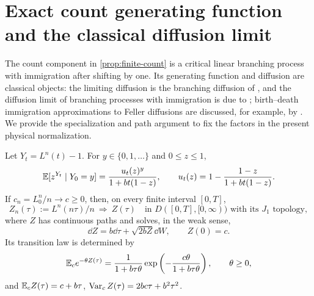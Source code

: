 \section{Exact count generating function and the classical diffusion limit}
\label{app:finite-count}

The count component in \cref{prop:finite-count} is a critical linear
branching process with immigration after shifting by one. Its generating
function and diffusion are classical objects: the limiting diffusion is the
branching diffusion of \citet{Feller1951}, and the diffusion limit of
branching processes with immigration is due to \citet{KawazuWatanabe1971};
birth--death immigration approximations to Feller diffusions are discussed,
for example, by \citet{GiornoNobile2021}. We provide the specialization and
path argument to fix the factors in the present physical normalization.

\begin{proposition}
\label{prop:count-diffusion}
Let $Y_t=L^n(t)-1$. For $y\in\{0,1,\ldots\}$ and $0\leq z\leq1$,
\begin{equation}
 \mathbb E[z^{Y_t}\mid Y_0=y]
 =\frac{u_t(z)^y}{1+bt(1-z)},\qquad
 u_t(z)=1-\frac{1-z}{1+bt(1-z)}.
 \label{eq:count-pgf}
\end{equation}
If $c_n=L_0^n/n\to c\geq0$, then, on every finite interval $[0,T]$,
\begin{equation}
 Z_n(\tau):=L^n(n\tau)/n\ \Longrightarrow\ Z(\tau)
 \quad\text{in }D([0,T],[0,\infty))\text{ with its }J_1\text{ topology},
 \label{eq:count-diffusion-limit}
\end{equation}
where $Z$ has continuous paths and solves, in the weak sense,
\begin{equation}
 \dd Z=b\dd\tau+\sqrt{2bZ}\dd W,\qquad Z(0)=c.
 \label{eq:count-sde}
\end{equation}
Its transition law is determined by
\begin{equation}
 \mathbb E_c e^{-\theta Z(\tau)}
 =\frac1{1+b\tau\theta}
   \exp\left(-\frac{c\theta}{1+b\tau\theta}\right),\qquad\theta\geq0,
 \label{eq:count-laplace}
\end{equation}
and
$\mathbb E_c Z(\tau)=c+b\tau$,
$\operatorname{Var}_c Z(\tau)=2bc\tau+b^2\tau^2$.
\end{proposition}

